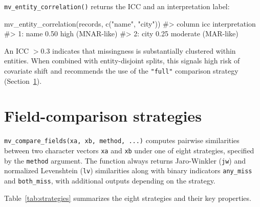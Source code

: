 \documentclass[a4paper]{article}
\begin{document}
\begin{article}
\texttt{mv\_entity\_correlation()} returns the ICC and an interpretation
label:

\begin{example}
mv_entity_correlation(records, c("name", "city"))
#>    column  icc interpretation
#> 1:   name 0.50 high (MNAR-like)
#> 2:   city 0.25 moderate (MAR-like)
\end{example}

An ICC $> 0.3$ indicates that missingness is substantially clustered
within entities. When combined with entity-disjoint splits, this signals
high risk of covariate shift and recommends the use of the
\texttt{"full"} comparison strategy (Section~\ref{sec:field}).

\section{Field-comparison strategies}
\label{sec:field}

\texttt{mv\_compare\_fields(xa, xb, method, ...)} computes pairwise
similarities between two character vectors \texttt{xa} and \texttt{xb}
under one of eight strategies, specified by the \texttt{method}
argument. The function always returns Jaro-Winkler (\texttt{jw}) and
normalized Levenshtein (\texttt{lv}) similarities along with binary
indicators \texttt{any\_miss} and \texttt{both\_miss}, with additional
outputs depending on the strategy.

Table~\ref{tab:strategies} summarizes the eight strategies and their
key properties.


\end{article}
\end{document}
